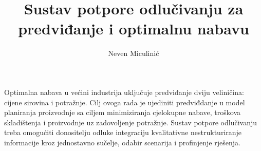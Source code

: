 \documentclass[times, utf8, zavrsni]{fer}
\begin{document}
\theoremstyle{definition}
\newtheorem{definition}{Definition}[section]

\title{Sustav potpore odlučivanju za predviđanje i optimalnu nabavu
}
\author{Neven Miculinić}

\maketitle

\tableofcontents



\begin{sazetak}
    Optimalna nabava u većini industrija uključuje predviđanje dviju veliničina: cijene sirovina i potražnje. Cilj ovoga rada je ujediniti predviđdanje u model planiranja proizvodnje sa ciljem minimiziranja cjelokupne nabave, troškova skladištenja i proizvodnje uz zadovoljenje potražnje. Sustav potpore odlučivanju treba omogućiti donositelju odluke integraciju kvalitativne nestrukturiranje informacije kroz jednostavno sučelje, odabir scenarija i profinjenje rješenja.
\end{sazetak}









\end{document}
